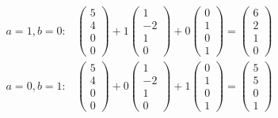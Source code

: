 \documentclass[12pt,letterpaper]{exam}
\begin{document}
\begin{questions}
{\[\begin{aligned}
	a=1, b=0 \colon& \begin{pmatrix} 5 \\ 4 \\ 0 \\ 0 \end{pmatrix} + 1 \begin{pmatrix} 1 \\ -2 \\ 1 \\ 0 \end{pmatrix} + 0 \begin{pmatrix} 0 \\ 1 \\ 0 \\ 1 \end{pmatrix}= \begin{pmatrix} 6 \\ 2 \\ 1 \\ 0 \end{pmatrix} \\[0.2cm]
	a=0, b=1 \colon& \begin{pmatrix} 5 \\ 4 \\ 0 \\ 0 \end{pmatrix} + 0 \begin{pmatrix} 1 \\ -2 \\ 1 \\ 0 \end{pmatrix} + 1 \begin{pmatrix} 0 \\ 1 \\ 0 \\ 1 \end{pmatrix}= \begin{pmatrix} 5 \\ 5 \\ 0 \\ 1 \end{pmatrix}
	\end{aligned}
	\]
}

\end{questions}
\end{document}
